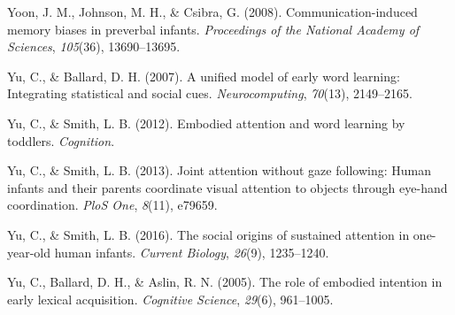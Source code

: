 \documentclass[a4paper,man,apacite,floatsintext]{apa6}
\begin{document}
\hypertarget{ref-yoon2008communication}{}
Yoon, J. M., Johnson, M. H., \& Csibra, G. (2008). Communication-induced
memory biases in preverbal infants. \emph{Proceedings of the National
Academy of Sciences}, \emph{105}(36), 13690--13695.

\hypertarget{ref-yu2007unified}{}
Yu, C., \& Ballard, D. H. (2007). A unified model of early word
learning: Integrating statistical and social cues.
\emph{Neurocomputing}, \emph{70}(13), 2149--2165.

\hypertarget{ref-yu2012embodied}{}
Yu, C., \& Smith, L. B. (2012). Embodied attention and word learning by
toddlers. \emph{Cognition}.

\hypertarget{ref-yu2013joint}{}
Yu, C., \& Smith, L. B. (2013). Joint attention without gaze following:
Human infants and their parents coordinate visual attention to objects
through eye-hand coordination. \emph{PloS One}, \emph{8}(11), e79659.

\hypertarget{ref-yu2016social}{}
Yu, C., \& Smith, L. B. (2016). The social origins of sustained
attention in one-year-old human infants. \emph{Current Biology},
\emph{26}(9), 1235--1240.

\hypertarget{ref-yu2005role}{}
Yu, C., Ballard, D. H., \& Aslin, R. N. (2005). The role of embodied
intention in early lexical acquisition. \emph{Cognitive Science},
\emph{29}(6), 961--1005.


\end{document}
